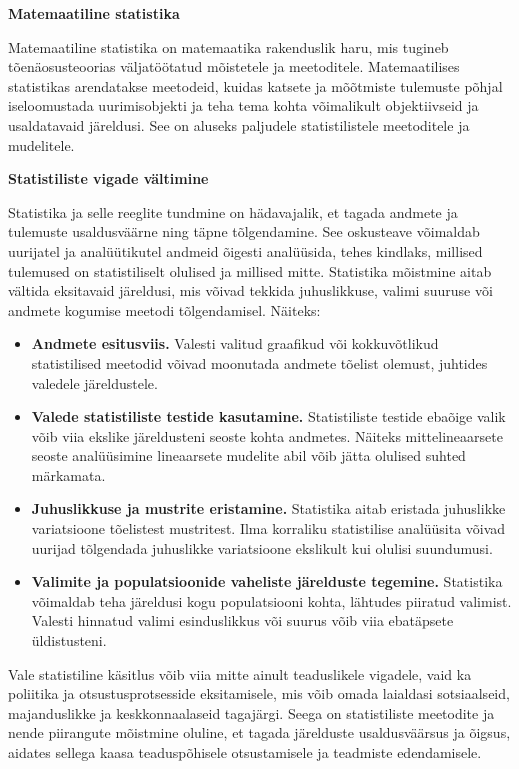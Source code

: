 \documentclass[
]{book}
\providecommand{\tightlist}{%
  \setlength{\itemsep}{0pt}\setlength{\parskip}{0pt}}
\begin{document}
\textbf{Matemaatiline statistika}

Matemaatiline statistika on matemaatika rakenduslik haru, mis tugineb tõenäosusteoorias väljatöötatud mõistetele ja meetoditele. Matemaatilises statistikas arendatakse meetodeid, kuidas katsete ja mõõtmiste tulemuste põhjal iseloomustada uurimisobjekti ja teha tema kohta võimalikult objektiivseid ja usaldatavaid järeldusi. See on aluseks paljudele statistilistele meetoditele ja mudelitele.

\textbf{Statistiliste vigade vältimine}

Statistika ja selle reeglite tundmine on hädavajalik, et tagada andmete ja tulemuste usaldusväärne ning täpne tõlgendamine. See oskusteave võimaldab uurijatel ja analüütikutel andmeid õigesti analüüsida, tehes kindlaks, millised tulemused on statistiliselt olulised ja millised mitte. Statistika mõistmine aitab vältida eksitavaid järeldusi, mis võivad tekkida juhuslikkuse, valimi suuruse või andmete kogumise meetodi tõlgendamisel. Näiteks:

\begin{itemize}
\tightlist
\item
  \textbf{Andmete esitusviis.} Valesti valitud graafikud või kokkuvõtlikud statistilised meetodid võivad moonutada andmete tõelist olemust, juhtides valedele järeldustele.
\item
  \textbf{Valede statistiliste testide kasutamine.} Statistiliste testide ebaõige valik võib viia ekslike järeldusteni seoste kohta andmetes. Näiteks mittelineaarsete seoste analüüsimine lineaarsete mudelite abil võib jätta olulised suhted märkamata.
\item
  \textbf{Juhuslikkuse ja mustrite eristamine.} Statistika aitab eristada juhuslikke variatsioone tõelistest mustritest. Ilma korraliku statistilise analüüsita võivad uurijad tõlgendada juhuslikke variatsioone ekslikult kui olulisi suundumusi.
\item
  \textbf{Valimite ja populatsioonide vaheliste järelduste tegemine.} Statistika võimaldab teha järeldusi kogu populatsiooni kohta, lähtudes piiratud valimist. Valesti hinnatud valimi esinduslikkus või suurus võib viia ebatäpsete üldistusteni.
\end{itemize}

Vale statistiline käsitlus võib viia mitte ainult teaduslikele vigadele, vaid ka poliitika ja otsustusprotsesside eksitamisele, mis võib omada laialdasi sotsiaalseid, majanduslikke ja keskkonnaalaseid tagajärgi. Seega on statistiliste meetodite ja nende piirangute mõistmine oluline, et tagada järelduste usaldusväärsus ja õigsus, aidates sellega kaasa teaduspõhisele otsustamisele ja teadmiste edendamisele.
\end{document}
